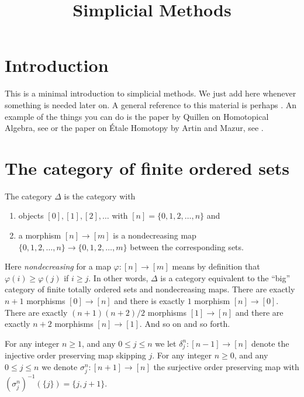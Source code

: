 

%


\title{Simplicial Methods}


\maketitle

\label{section-phantom}

\tableofcontents

\section{Introduction}
\label{section-introduction}

\noindent
This is a minimal introduction to simplicial methods.
We just add here whenever something is needed later on.
A general reference to this material is perhaps \cite{SimpHom}.
An example of the things you can do is the paper
by Quillen on Homotopical Algebra, see \cite{Quillen}
or the paper on \'Etale Homotopy by Artin and Mazur, see \cite{ArtinMazur}.

\section{The category of finite ordered sets}
\label{section-Delta}

\noindent
The category $\Delta$ is the category with
\begin{enumerate}
\item objects $[0], [1], [2], \ldots$ with
$[n] = \{0, 1, 2, \ldots, n\}$ and
\item a morphism $[n] \to [m]$ is a nondecreasing map
$\{0, 1, 2, \ldots, n\} \to \{0, 1, 2, \ldots, m\}$
between the corresponding sets.
\end{enumerate}
Here {\it nondecreasing} for a map $\varphi : [n] \to [m]$
means by definition that $\varphi(i) \geq \varphi(j)$ if $i \geq j$.
In other words, $\Delta$ is a category equivalent to the
``big'' category of finite totally ordered sets and nondecreasing maps.
There are exactly $n + 1$ morphisms $[0] \to [n]$ and
there is exactly $1$ morphism $[n] \to [0]$. There are
exactly $(n + 1)(n + 2)/2$ morphisms $[1] \to [n]$ and there are
exactly $n + 2$ morphisms $[n] \to [1]$. And so on and so forth.

\begin{definition}
\label{definition-face-degeneracy}
For any integer $n\geq 1$, and any $0\leq j \leq n$ we let
{\it $\delta^n_j : [n-1] \to [n]$}
denote the injective order preserving map skipping $j$. For any
integer $n\geq 0$, and any $0\leq j \leq n$ we denote
{\it $\sigma^n_j : [n + 1]  \to [n]$}
the surjective order preserving map with
$(\sigma^n_j)^{-1}(\{j\}) = \{j, j + 1\}$.
\end{definition}

